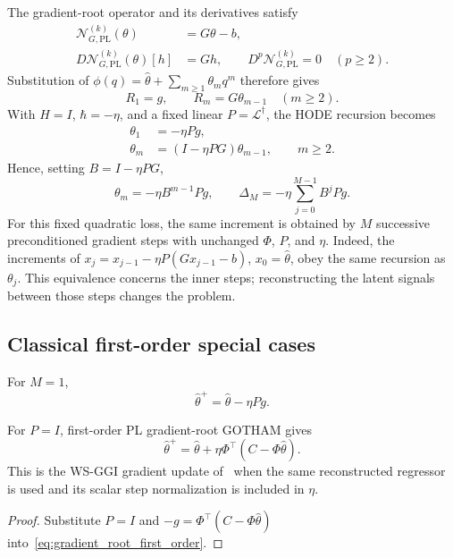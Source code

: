 The gradient-root operator and its derivatives satisfy
\begin{align}
\label{eq:gradient_root_operator}
    \mathcal N_{G,\mathrm{PL}}^{(k)}(\theta)&=G\theta-b,\\
\label{eq:gradient_root_derivatives}
    D\mathcal N_{G,\mathrm{PL}}^{(k)}(\theta)[h]&=Gh,
    \qquad D^p\mathcal N_{G,\mathrm{PL}}^{(k)}=0\quad(p\ge2).
\end{align}
Substitution of $\phi(q)=\hat\theta+\sum_{m\ge1}\theta_mq^m$
therefore gives
\begin{equation}
\label{eq:gradient_root_residuals}
    R_1=g,\qquad R_m=G\theta_{m-1}\quad(m\ge2).
\end{equation}
With $H=I$, $\hbar=-\eta$, and a fixed linear
$P=\mathcal L^\dagger$, the HODE recursion becomes
\begin{align}
\label{eq:gradient_root_theta1_general}
    \theta_1&=-\eta Pg,\\
\label{eq:gradient_root_thetam_general}
    \theta_m&=(I-\eta PG)\theta_{m-1},\qquad m\ge2.
\end{align}
Hence, setting $B=I-\eta PG$,
\begin{equation}
\label{eq:PL_gradient_arbitrary_order}
    \theta_m=-\eta B^{m-1}Pg,\qquad
    \Delta_M=-\eta\sum_{j=0}^{M-1}B^jPg.
\end{equation}
For this fixed quadratic loss, the same increment is obtained by $M$
successive preconditioned gradient steps with unchanged $\Phi$, $P$,
and $\eta$. Indeed, the increments of
$x_j=x_{j-1}-\eta P(Gx_{j-1}-b)$, $x_0=\hat\theta$, obey the same
recursion as $\theta_j$. This equivalence concerns the inner steps;
reconstructing the latent signals between those steps changes the problem.

\subsection{Classical first-order special cases}

For $M=1$,
\begin{equation}
\label{eq:gradient_root_first_order}
    \hat\theta^+=\hat\theta-\eta Pg.
\end{equation}

\begin{proposition}
\label{prop:WS_GGI_equivalence}
For $P=I$, first-order PL gradient-root GOTHAM gives
\begin{equation}
\label{eq:WS_GGI_equivalence_update}
    \hat\theta^+=\hat\theta+
    \eta\Phi^\top(C-\Phi\hat\theta).
\end{equation}
This is the WS-GGI gradient update of~\cite{Lv2026} when the same
reconstructed regressor is used and its scalar step normalization is
included in $\eta$.
\end{proposition}
\begin{proof}
Substitute $P=I$ and $-g=\Phi^\top(C-\Phi\hat\theta)$
into~\eqref{eq:gradient_root_first_order}.
\end{proof}

